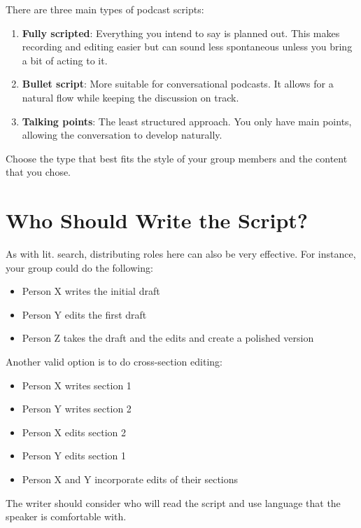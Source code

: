 \documentclass[
  letterpaper,
  DIV=11,
  numbers=noendperiod]{scrreprt}
\providecommand{\tightlist}{%
  \setlength{\itemsep}{0pt}\setlength{\parskip}{0pt}}\usepackage{longtable,booktabs,array}
\begin{document}
There are three main types of podcast scripts:

\begin{enumerate}
\def\labelenumi{\arabic{enumi}.}
\tightlist
\item
  \textbf{Fully scripted}: Everything you intend to say is planned out.
  This makes recording and editing easier but can sound less spontaneous
  unless you bring a bit of acting to it.
\item
  \textbf{Bullet script}: More suitable for conversational podcasts. It
  allows for a natural flow while keeping the discussion on track.
\item
  \textbf{Talking points}: The least structured approach. You only have
  main points, allowing the conversation to develop naturally.
\end{enumerate}

Choose the type that best fits the style of your group members and the
content that you chose.

\section{Who Should Write the
Script?}\label{who-should-write-the-script}

As with lit. search, distributing roles here can also be very effective.
For instance, your group could do the following:

\begin{itemize}
\tightlist
\item
  Person X writes the initial draft
\item
  Person Y edits the first draft
\item
  Person Z takes the draft and the edits and create a polished version
\end{itemize}

Another valid option is to do cross-section editing:

\begin{itemize}
\tightlist
\item
  Person X writes section 1
\item
  Person Y writes section 2
\item
  Person X edits section 2
\item
  Person Y edits section 1
\item
  Person X and Y incorporate edits of their sections
\end{itemize}

The writer should consider who will read the script and use language
that the speaker is comfortable with.
\end{document}

